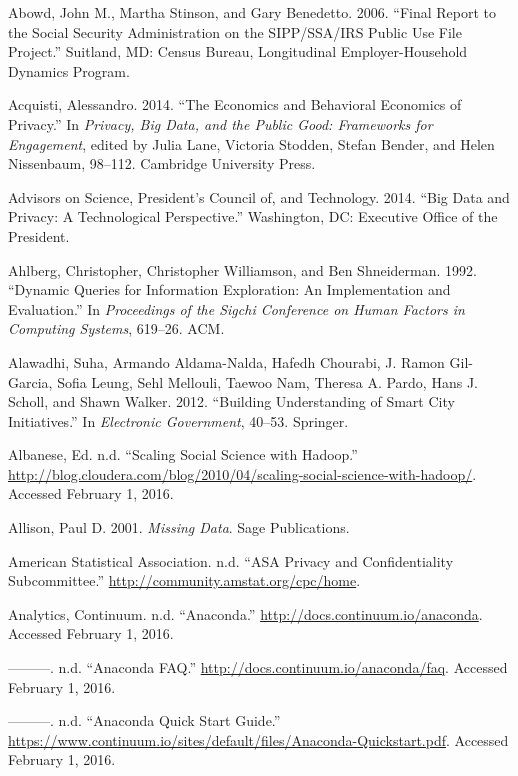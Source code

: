 \documentclass[]{krantz}
\begin{document}
\hypertarget{ref-abowd2006final}{}
Abowd, John M., Martha Stinson, and Gary Benedetto. 2006. ``Final Report
to the Social Security Administration on the SIPP/SSA/IRS Public Use
File Project.'' Suitland, MD: Census Bureau, Longitudinal
Employer-Household Dynamics Program.

\hypertarget{ref-Acquisti2014}{}
Acquisti, Alessandro. 2014. ``The Economics and Behavioral Economics of
Privacy.'' In \emph{Privacy, Big Data, and the Public Good: Frameworks
for Engagement}, edited by Julia Lane, Victoria Stodden, Stefan Bender,
and Helen Nissenbaum, 98--112. Cambridge University Press.

\hypertarget{ref-house2014big}{}
Advisors on Science, President's Council of, and Technology. 2014. ``Big
Data and Privacy: A Technological Perspective.'' Washington, DC:
Executive Office of the President.

\hypertarget{ref-ahlberg1992dynamic}{}
Ahlberg, Christopher, Christopher Williamson, and Ben Shneiderman. 1992.
``Dynamic Queries for Information Exploration: An Implementation and
Evaluation.'' In \emph{Proceedings of the Sigchi Conference on Human
Factors in Computing Systems}, 619--26. ACM.

\hypertarget{ref-alawadhi2012building}{}
Alawadhi, Suha, Armando Aldama-Nalda, Hafedh Chourabi, J. Ramon
Gil-Garcia, Sofia Leung, Sehl Mellouli, Taewoo Nam, Theresa A. Pardo,
Hans J. Scholl, and Shawn Walker. 2012. ``Building Understanding of
Smart City Initiatives.'' In \emph{Electronic Government}, 40--53.
Springer.

\hypertarget{ref-socialhadoop}{}
Albanese, Ed. n.d. ``Scaling Social Science with Hadoop.''
\url{http://blog.cloudera.com/blog/2010/04/scaling-social-science-with-hadoop/}.
Accessed February 1, 2016.

\hypertarget{ref-allison2001missing}{}
Allison, Paul D. 2001. \emph{Missing Data}. Sage Publications.

\hypertarget{ref-AmericanStatisticalAssociation}{}
American Statistical Association. n.d. ``ASA Privacy and Confidentiality
Subcommittee.'' \url{http://community.amstat.org/cpc/home}.

\hypertarget{ref-Anaconda}{}
Analytics, Continuum. n.d. ``Anaconda.''
\url{http://docs.continuum.io/anaconda}. Accessed February 1, 2016.

\hypertarget{ref-AnacondaFAQ}{}
---------. n.d. ``Anaconda FAQ.''
\url{http://docs.continuum.io/anaconda/faq}. Accessed February 1, 2016.

\hypertarget{ref-AnacondaQSG}{}
---------. n.d. ``Anaconda Quick Start Guide.''
\url{https://www.continuum.io/sites/default/files/Anaconda-Quickstart.pdf}.
Accessed February 1, 2016.
\end{document}
